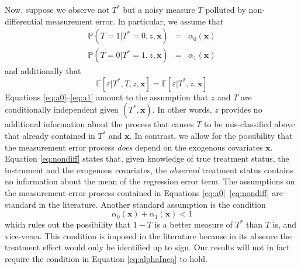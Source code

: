 Now, suppose we observe not $T^*$ but a noisy measure $T$ polluted by non-differential measurement error.
In particular, we assume that
\begin{eqnarray}
  \label{eq:a0}
  \mathbb{P}(T = 1| T^* = 0, z, \mathbf{x})  &=&  \alpha_0(\mathbf{x})\\
  \label{eq:a1}
  \mathbb{P}(T = 0| T^* = 1, z, \mathbf{x})  &=&  \alpha_1(\mathbf{x})
\end{eqnarray}
and additionally that
\begin{equation}
  \mathbb{E}[\varepsilon|T^*,T,z,\mathbf{x}] =  \mathbb{E}[\varepsilon|T^*,z,\mathbf{x}]
  \label{eq:nondiff}
\end{equation}
Equations \ref{eq:a0}--\ref{eq:a1} amount to the assumption that $z$ and $T$ are conditionally independent given $(T^*,\mathbf{x})$. 
In other words, $z$ provides no additional information about the process that causes $T$ to be mis-classified above that already contained in $T^*$ and $\mathbf{x}$.
In contrast, we allow for the possibility that the measurement error process \emph{does} depend on the exogenous covariates $\mathbf{x}$. 
Equation \ref{eq:nondiff} states that, given knowledge of true treatment status, the instrument and the exogenous covariates, the \emph{observed} treatment status contains no information about the mean of the regression error term.  
The assumptions on the measurement error process contained in Equations \ref{eq:a0}--\ref{eq:nondiff} are standard in the literature.
Another standard assumption is the condition
\begin{equation}
  \alpha_0(\mathbf{x}) + \alpha_1(\mathbf{x}) < 1
  \label{eq:alphaIneq}
\end{equation}
which rules out the possibility that $1-T$ is a better measure of $T^*$ than $T$ is, and vice-versa.
This condition is imposed in the literature \citep{Mahajan,Lewbel,FL,BBS,KRS} because in its absence the treatment effect would only be identified up to sign.
Our results will not in fact require the condition in Equation \ref{eq:alphaIneq} to hold.



